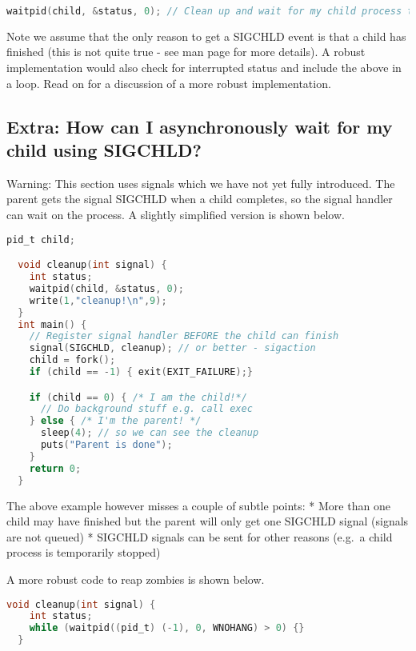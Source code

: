 \begin{lstlisting}[language=C]
  waitpid(child, &status, 0); // Clean up and wait for my child process to finish.
\end{lstlisting}

Note we assume that the only reason to get a SIGCHLD event is that a child has finished (this is not quite true - see man page for more details). A robust implementation would also check for interrupted status and include the above in a loop. Read on for a discussion of a more robust implementation.

\subsection{Extra: How can I asynchronously wait for my child using SIGCHLD?}

Warning: This section uses signals which we have not yet fully introduced. The parent gets the signal SIGCHLD when a child completes, so the signal handler can wait on the process. A slightly simplified version is shown below.

\begin{lstlisting}[language=C]
  pid_t child;

  void cleanup(int signal) {
    int status;
    waitpid(child, &status, 0);
    write(1,"cleanup!\n",9);
  }
  int main() {
    // Register signal handler BEFORE the child can finish
    signal(SIGCHLD, cleanup); // or better - sigaction
    child = fork();
    if (child == -1) { exit(EXIT_FAILURE);}

    if (child == 0) { /* I am the child!*/
      // Do background stuff e.g. call exec   
    } else { /* I'm the parent! */
      sleep(4); // so we can see the cleanup
      puts("Parent is done");
    }
    return 0;
  } 
\end{lstlisting}

The above example however misses a couple of subtle points: * More than one child may have finished but the parent will only get one SIGCHLD signal (signals are not queued) * SIGCHLD signals can be sent for other reasons (e.g.~a child process is temporarily stopped)

A more robust code to reap zombies is shown below.

\begin{lstlisting}[language=C]
  void cleanup(int signal) {
    int status;
    while (waitpid((pid_t) (-1), 0, WNOHANG) > 0) {}
  }
\end{lstlisting}

